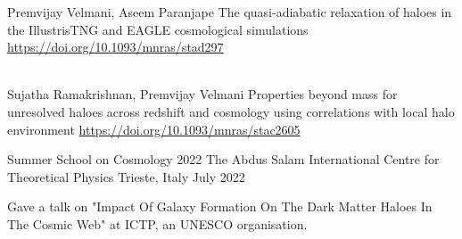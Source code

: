 
\begin{cventries}

{
\cventry
{Premvijay Velmani, Aseem Paranjape}
{The quasi-adiabatic relaxation of haloes in the IllustrisTNG and EAGLE cosmological simulations}
{\url{https://doi.org/10.1093/mnras/stad297}}
{}
{
}
}

~\\[-8mm]
{
\cventry
{Sujatha Ramakrishnan, Premvijay Velmani}
{Properties beyond mass for unresolved haloes across redshift and cosmology using correlations with local halo environment}
{\url{https://doi.org/10.1093/mnras/stac2605}}
{}
{
}
}

\end{cventries}


\newpage
{}

\begin{cventries}

{
\cventry
{Summer School on Cosmology 2022}
{The Abdus Salam International Centre for Theoretical Physics}
{Trieste, Italy}
{July 2022}
{
\begin{cvitems}
\item {Gave a talk on "Impact Of Galaxy Formation On The Dark Matter Haloes In The Cosmic Web" at ICTP, an UNESCO organisation.}
\end{cvitems}
}
}

\end{cventries}